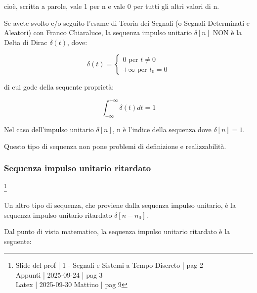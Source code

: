cioè, scritta a parole, vale 1 per n e vale 0 per tutti gli altri valori di n. \newline 

\begin{tcolorbox}
    Se avete svolto e/o seguito l'esame di Teoria dei Segnali (o Segnali Determinati e Aleatori) con Franco Chiaraluce, 
    la sequenza impulso unitario $\delta [n]$ NON è la Delta di Dirac $\delta (t)$, dove: 
    
    {
        \Large 
        \begin{equation}
            \delta (t)
            = 
            \begin{cases}
                0 \text{ per } t \neq 0
                \\
                + \infty \text{ per } t_0 = 0
            \end{cases}
        \end{equation}
    }

    di cui gode della sequente proprietà: 

    {
        \Large 
        \begin{equation}
            \int_{- \infty}^{+\infty} \delta (t) dt = 1
        \end{equation}
    }

    Nel caso dell'impulso unitario $\delta \left[ n\right]$, n è l'indice della sequenza dove $\delta \left[ n\right] = 1$. 

\end{tcolorbox}

Questo tipo di sequenza non pone problemi di definizione e realizzabilità. \newline 

\newpage 

\subsubsection{Sequenza impulso unitario ritardato}

\footnote{ 
    Slide del prof | 1 - Segnali e Sistemi a Tempo Discreto | pag 2 \\
    Appunti | 2025-09-24 | pag 3 \\ 
    Latex | 2025-09-30 Mattino | pag 9
}

Un altro tipo di sequenza, che proviene dalla sequenza impulso unitario, 
è la sequenza impulso unitario ritardato $\delta \left[n - n_0\right]$. \newline 

Dal punto di vista matematico, la sequenza impulso unitario ritardato è la seguente: 

